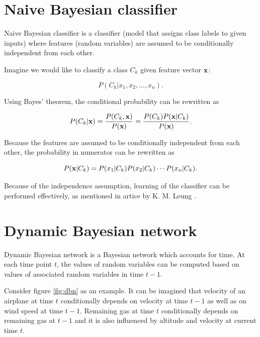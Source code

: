 \documentclass[thesis=B,english]{FITthesis}[2012/06/26]
\begin{document}
\section{Naive Bayesian classifier}

Naive Bayesian classifier is a classifier (model that assigns class labels to given inputs) where features (random variables) are assumed to be conditionally independent from each other.

Imagine we would like to classify a class $C_k$ given feature vector $\textbf x$:

\begin{equation}
P(C_k | x_1, x_2, \dots, x_n).
\end{equation}

Using Bayes' theorem, the conditional probability can be rewritten as

\begin{equation}
P(C_k | \textbf x) = \frac{P(C_k,\textbf x)}{P(\textbf x)} = \frac{P(C_k) P(\textbf x | C_k)}{P(\textbf x)}.
\end{equation}

Because the features are assumed to be conditionally independent from each other, the probability in numerator can be rewritten as

\begin{equation}
P(\textbf x | C_k) = P(x_1|C_k) P(x_2|C_k) \cdots P(x_n|C_k).
\end{equation}

Because of the independence assumption, learning of the classifier can be performed effectively, as mentioned in artice by K. M. Leung \cite{naive-bayesian-classifier}.

\section{Dynamic Bayesian network}

Dynamic Bayesian network is a Bayesian network which accounts for time. At each time point $t$, the values of random variables can be computed based on values of associated random variables in time $t-1$.

Consider figure \ref{fig:dbn} as an example. It can be imagined that velocity of an airplane at time $t$ conditionally depends on velocity at time $t-1$ as well as on wind speed at time $t-1$. Remaining gas at time $t$ conditionally depends on remaining gas at $t-1$ and it is also influenced by altitude and velocity at current time $t$.
\end{document}
